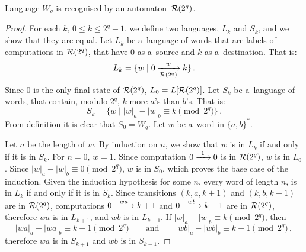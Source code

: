 \documentclass[12pt,a4paper]{report}
\let\openright=\clearpage
\begin{document}
\begin{lemma}\label{lm:W_q_recognised_by_R2q}
    Language $W_q$ is recognised by an automaton~${\mathcal{R}}(2^q)$.
\end{lemma}

\begin{proof}
    For each $k$, $0 \leq k \leq 2^q - 1$, we define two languages, $L_k$ and $S_k$, and we show that they are equal. Let $L_k$ be a~language of words that are labels of computations in ${\mathcal{R}}(2^q)$, that have $0$ as a~source and $k$ as a~destination. That is:
    \[
        L_k = \{ w \mid 0 {\; \xrightarrow[{\mathcal{R}}(2^q)]{\: \; w \: \;} \;} k \} \, .
    \]
    Since $0$ is the only final state of ${\mathcal{R}}(2^q)$, $L_0 = L[{\mathcal{R}}(2^q)]$. Let $S_k$ be a~language of words, that contain, modulo $2^q$, $k$ more $a$'s than $b$'s. That is:
    \[
        S_k = \{ w \mid |w|_a - |w|_b \equiv k \pmod{2^q} \} \, .
    \]
    From definition it is clear that $S_0 = W_q$. Let $w$ be a~word in ${\{a, b\}}^*$.

    Let $n$ be the length of $w$. By induction on $n$, we show that $w$ is in $L_k$ if and only if it is in $S_k$. For $n = 0$, $w = 1$. Since computation $0 {\; \xrightarrow[]{\: \; 1 \: \;} \;} 0$ is in ${\mathcal{R}}(2^q)$, $w$ is in $L_0$. Since $|w|_a - |w|_b \equiv 0 \pmod{2^q}$, $w$ is in $S_0$, which proves the base case of the induction. Given the induction hypothesis for some $n$, every word of length $n$, is in $L_k$ if and only if it is in $S_k$. Since transitions $(k, a, k+1)$ and $(k, b, k-1)$ are in ${\mathcal{R}}(2^q)$, computations $0 {\; \xrightarrow[]{\: \; wa \: \;} \;} k+1$ and $0 {\; \xrightarrow[]{\: \; wb \: \;} \;} k-1$ are in ${\mathcal{R}}(2^q)$, therefore $wa$ is in $L_{k+1}$, and $wb$ is in $L_{k-1}$. If $|w|_a - |w|_b \equiv k \pmod{2^q}$, then
    \[
        |wa|_a - |wa|_b \equiv k+1 \pmod{2^q} \qquad \text{and} \qquad |wb|_a - |wb|_b \equiv k-1 \pmod{2^q} \, ,
    \]
    therefore $wa$ is in $S_{k+1}$ and $wb$ is in $S_{k-1}$.
\end{proof}

\openright
\end{document}
